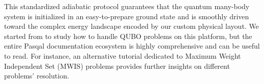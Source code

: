 This standardized adiabatic protocol guarantees that the quantum many-body system is initialized in an easy-to-prepare ground state and is smoothly driven toward the complex energy landscape encoded by our custom physical layout.
We started from \cite{pasqal_qubo_qaa} to study how to handle QUBO problems on this platform, but the entire Pasqal documentation ecosystem is highly comprehensive and can be useful to read. For instance, an alternative tutorial dedicated to Maximum Weight Independent Set (MWIS) problems \cite{pasqal_mwis_qaa} provides further insights on different problems' resolution.
